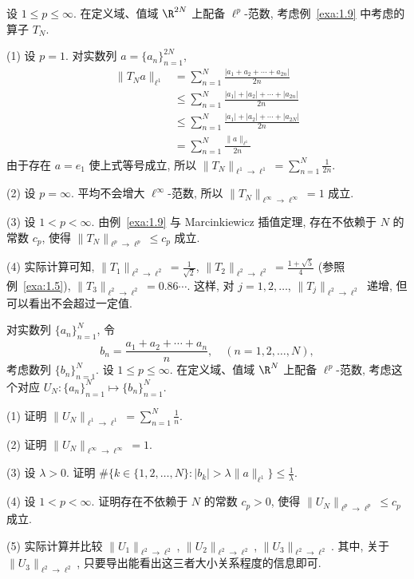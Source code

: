 \begin{example}\label{exa:1.10}
设 $1 \leq p \leq \infty$. 在定义域、值域 $\R^{2N}$ 上配备 $\ell^{p}$-范数, 考虑例~\ref{exa:1.9} 中考虑的算子 $T_{N}$.

(1) 设 $p = 1$. 对实数列 $a = \{a_{n}\}_{n=1}^{2N}$,
\begin{align*}
\|T_{N}a\|_{\ell^{1}} & = \sum_{n=1}^{N} \frac{|a_{1} + a_{2} + \cdots + a_{2n}|}{2n} \\
& \leq \sum_{n=1}^{N} \frac{|a_{1}| + |a_{2}| + \cdots + |a_{2n}|}{2n} \\
& \leq \sum_{n=1}^{N} \frac{|a_{1}| + |a_{2}| + \cdots + |a_{2N}|}{2n} \\
& = \sum_{n=1}^{N} \frac{\|a\|_{\ell^{1}}}{2n}
\end{align*}
由于存在 $a = e_{1}$ 使上式等号成立, 所以 $\|T_{N}\|_{\ell^{1} \to \ell^{1}} = \sum_{n=1}^{N} \frac{1}{2n}$.

(2) 设 $p = \infty$. 平均不会增大 $\ell^{\infty}$-范数, 所以 $\|T_{N}\|_{\ell^{\infty} \to \ell^{\infty}} = 1$ 成立.

(3) 设 $1 < p < \infty$. 由例~\ref{exa:1.9} 与 Marcinkiewicz 插值定理, 存在不依赖于 $N$ 的常数 $c_{p}$, 使得 $\|T_{N}\|_{\ell^{p} \to \ell^{p}} \leq c_{p}$ 成立.

(4) 实际计算可知, $\|T_{1}\|_{\ell^{2} \to \ell^{2}} = \frac{1}{\sqrt{2}}$, $\|T_{2}\|_{\ell^{2} \to \ell^{2}} = \frac{1 + \sqrt{5}}{4}$ (参照例~\ref{exa:1.5}), $\|T_{3}\|_{\ell^{2} \to \ell^{2}} = 0.86\cdots$. 这样, 对 $j = 1, 2, \ldots$, $\|T_{j}\|_{\ell^{2} \to \ell^{2}}$ 递增, 但可以看出不会超过一定值.
\end{example}

\begin{exercise}\label{exer:1.17}
对实数列 $\{a_{n}\}_{n=1}^{N}$, 令
\[
b_{n} = \frac{a_{1} + a_{2} + \cdots + a_{n}}{n}, \quad (n = 1, 2, \ldots, N),
\]
考虑数列 $\{b_{n}\}_{n=1}^{N}$. 设 $1 \leq p \leq \infty$. 在定义域、值域 $\R^{N}$ 上配备 $\ell^{p}$-范数, 考虑这个对应 $U_{N}: \{a_{n}\}_{n=1}^{N} \mapsto \{b_{n}\}_{n=1}^{N}$.

(1) 证明 $\|U_{N}\|_{\ell^{1} \to \ell^{1}} = \sum_{n=1}^{N} \frac{1}{n}$.

(2) 证明 $\|U_{N}\|_{\ell^{\infty} \to \ell^{\infty}} = 1$.

(3) 设 $\lambda > 0$. 证明 $\# \{k \in \{1, 2, \ldots, N\} : |b_k| > \lambda\|a\|_{\ell^{1}}\} \leq \frac{1}{\lambda}$.

(4) 设 $1 < p < \infty$. 证明存在不依赖于 $N$ 的常数 $c_{p} > 0$, 使得 $\|U_{N}\|_{\ell^{p} \to \ell^{p}} \leq c_{p}$ 成立.

(5) 实际计算并比较 $\|U_{1}\|_{\ell^{2} \to \ell^{2}}$, $\|U_{2}\|_{\ell^{2} \to \ell^{2}}$, $\|U_{3}\|_{\ell^{2} \to \ell^{2}}$. 其中, 关于 $\|U_{3}\|_{\ell^{2} \to \ell^{2}}$, 只要导出能看出这三者大小关系程度的信息即可.
\end{exercise}
